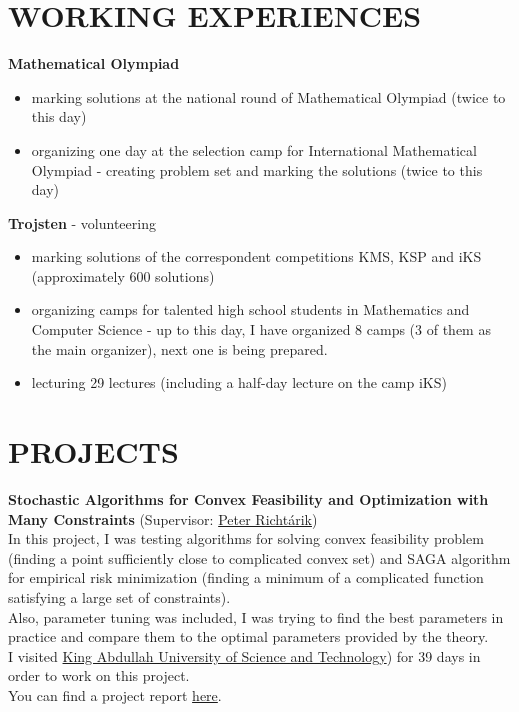\documentclass[margin, 10pt]{res} %
\begin{document}
\begin{resume}
		
		
		\section{WORKING EXPERIENCES}
		\textbf{Mathematical Olympiad}
		\begin{itemize}  \itemsep -2pt %
			\item marking solutions at the national round of Mathematical Olympiad (twice to this day)
			\item organizing one day at the selection camp for International Mathematical Olympiad - creating problem set and marking the solutions (twice to this day)
		\end{itemize}
		\textbf{Trojsten} - volunteering
		\begin{itemize} \itemsep -2pt %
			\item marking solutions of the correspondent competitions KMS, KSP and iKS (approximately 600 solutions)
			\item organizing camps for talented high school students in Mathematics and Computer Science - up to this day, I have organized 8 camps (3 of them as the main organizer), next one is being prepared.
			\item lecturing 29 lectures (including a half-day lecture on the camp iKS)
		\end{itemize}
		
		\section{PROJECTS}
		\textbf{Stochastic Algorithms for Convex Feasibility and Optimization with Many Constraints} (Supervisor: \href{https://scholar.google.com/citations?user=pGh242UAAAAJ&hl=en}{
			Peter Richt\'{a}rik})\\
		In this project, I was testing algorithms for solving convex feasibility problem (finding a point sufficiently close to complicated convex set) and SAGA algorithm for empirical risk minimization (finding a minimum of a complicated function satisfying a large set of constraints).\\
		Also, parameter tuning was included, I was trying to find the best parameters in practice and compare them to the optimal parameters provided by the theory.\\
		I visited \href{https://www.kaust.edu.sa/en}{King Abdullah University of Science and Technology}) for 39 days in order to work on this project.\\
		You can find a project report \href{https://github.com/slavoh/rocnikac/blob/master/report_new/report.pdf}{here}.
		

\end{resume}
\end{document}
